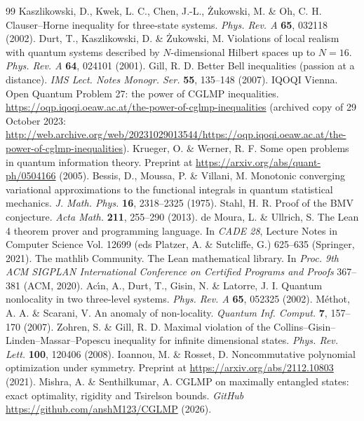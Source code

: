 \begin{thebibliography}{99}
 Kaszlikowski, D., Kwek, L. C., Chen, J.-L., \.{Z}ukowski, M. \& Oh, C. H. Clauser--Horne inequality for three-state systems. \textit{Phys. Rev. A} \textbf{65}, 032118 (2002).
 Durt, T., Kaszlikowski, D. \& \.{Z}ukowski, M. Violations of local realism with quantum systems described by $N$-dimensional Hilbert spaces up to $N=16$. \textit{Phys. Rev. A} \textbf{64}, 024101 (2001).
 Gill, R. D. Better Bell inequalities (passion at a distance). \textit{IMS Lect. Notes Monogr. Ser.} \textbf{55}, 135--148 (2007).
 IQOQI Vienna. Open Quantum Problem 27: the power of CGLMP inequalities. \url{https://oqp.iqoqi.oeaw.ac.at/the-power-of-cglmp-inequalities} (archived copy of 29 October 2023: \url{http://web.archive.org/web/20231029013544/https://oqp.iqoqi.oeaw.ac.at/the-power-of-cglmp-inequalities}).
 Krueger, O. \& Werner, R. F. Some open problems in quantum information theory. Preprint at \url{https://arxiv.org/abs/quant-ph/0504166} (2005).
 Bessis, D., Moussa, P. \& Villani, M. Monotonic converging variational approximations to the functional integrals in quantum statistical mechanics. \textit{J. Math. Phys.} \textbf{16}, 2318--2325 (1975).
 Stahl, H. R. Proof of the BMV conjecture. \textit{Acta Math.} \textbf{211}, 255--290 (2013).
 de Moura, L. \& Ullrich, S. The Lean 4 theorem prover and programming language. In \textit{CADE 28}, Lecture Notes in Computer Science Vol. 12699 (eds Platzer, A. \& Sutcliffe, G.) 625--635 (Springer, 2021).
 The mathlib Community. The Lean mathematical library. In \textit{Proc. 9th ACM SIGPLAN International Conference on Certified Programs and Proofs} 367--381 (ACM, 2020).
 Ac\'{\i}n, A., Durt, T., Gisin, N. \& Latorre, J. I. Quantum nonlocality in two three-level systems. \textit{Phys. Rev. A} \textbf{65}, 052325 (2002).
 M\'{e}thot, A. A. \& Scarani, V. An anomaly of non-locality. \textit{Quantum Inf. Comput.} \textbf{7}, 157--170 (2007).
 Zohren, S. \& Gill, R. D. Maximal violation of the Collins--Gisin--Linden--Massar--Popescu inequality for infinite dimensional states. \textit{Phys. Rev. Lett.} \textbf{100}, 120406 (2008).
 Ioannou, M. \& Rosset, D. Noncommutative polynomial optimization under symmetry. Preprint at \url{https://arxiv.org/abs/2112.10803} (2021).
 Mishra, A. \& Senthilkumar, A. CGLMP on maximally entangled states: exact optimality, rigidity and Tsirelson bounds. \textit{GitHub} \url{https://github.com/anshM123/CGLMP} (2026).

\end{thebibliography}
